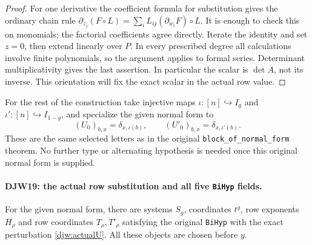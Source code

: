 \documentclass[11pt,a4paper]{article}
\numberwithin{equation}{section}
\theoremstyle{remark}\newtheorem{remark}[theorem]{Remark}
\begin{document}
\begin{proof}
For one derivative the coefficient formula for substitution gives
the ordinary chain rule
$\partial_{z_j}(F\circ L)
=\sum_iL_{ij}(\partial_{w_i}F)\circ L$.
It is enough to check this on monomials; the factorial coefficients
agree directly.  Iterate the identity and set $z=0$, then extend
linearly over $P$.  In every prescribed degree all calculations
involve finite polynomials, so the argument applies to formal
series.  Determinant multiplicativity gives the last assertion.
In particular the scalar is $\det A$, not its inverse.  This
orientation will fix the exact scalar in the actual row value.
\end{proof}

For the rest of the construction take injective maps
$\iota:[n]\hookrightarrow I_g$ and
$\iota':[n]\hookrightarrow I_{1-g}$, and specialize the
given normal form to
\[
 (U_0)_{b,x}=\delta_{x,\iota(b)},\qquad
 (U'_0)_{b,x}=\delta_{x,\iota'(b)}.
\]
These are the same selected letters as in the original
\texttt{block\_\allowbreak of\_\allowbreak normal\_\allowbreak form} theorem.  No further
type or alternating hypothesis is needed once this original
normal form is supplied.

\paragraph{DJW19: the actual row substitution and all five \texttt{Bi\allowbreak Hyp} fields.}
\label{claim:DJW19}
For the given normal form, there are systems $S_g$, coordinates
$t^g$, row exponents $H_\rho$ and row coordinates
$T_\rho,T'_\rho$ satisfying the original \texttt{Bi\allowbreak Hyp} with
the exact perturbation \eqref{djw:actualU}.
All these objects are chosen before $y$.
\end{document}
